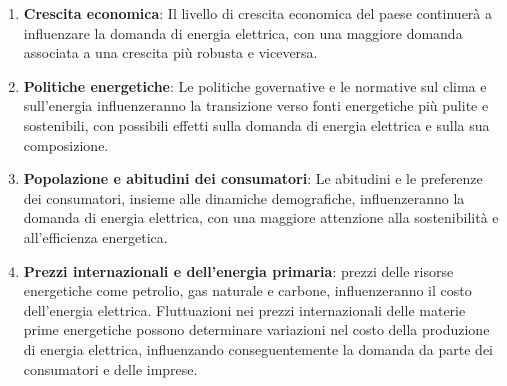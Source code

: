 \documentclass{article}
\begin{document}
\begin{enumerate}
    \item \textbf{Crescita economica}: Il livello di crescita economica del paese continuerà a influenzare la domanda di energia elettrica, con una maggiore domanda associata a una crescita più robusta e viceversa.
    \item \textbf{Politiche energetiche}: Le politiche governative e le normative sul clima e sull'energia influenzeranno la transizione verso fonti energetiche più pulite e sostenibili, con possibili effetti sulla domanda di energia elettrica e sulla sua composizione.
    \item \textbf{Popolazione e abitudini dei consumatori}: Le abitudini e le preferenze dei consumatori, insieme alle dinamiche demografiche, influenzeranno la domanda di energia elettrica, con una maggiore attenzione alla sostenibilità e all'efficienza energetica.
    \item \textbf{Prezzi internazionali e dell’energia primaria}: prezzi delle risorse energetiche come petrolio, gas naturale e carbone, influenzeranno il costo dell'energia elettrica. Fluttuazioni nei prezzi internazionali delle materie prime energetiche possono determinare variazioni nel costo della produzione di energia elettrica, influenzando conseguentemente la domanda da parte dei consumatori e delle imprese.
\end{enumerate}
\end{document}
